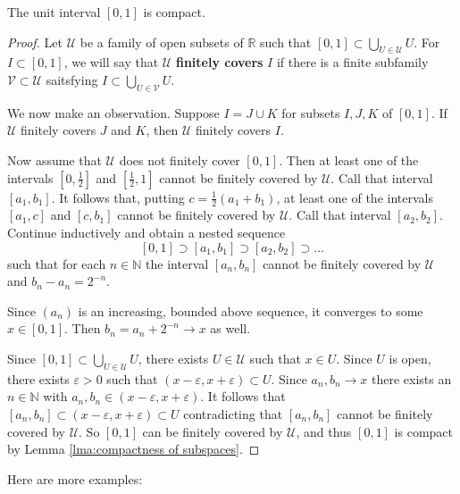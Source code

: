 \documentclass[a4paper]{article}
\begin{document}
\begin{theorem}\label{lma:[0,1] is compact}
    The unit interval $[0,1]$ is compact.
\end{theorem}
\begin{proof}
    Let $\mathcal{U}$ be a family of open subsets of $\mathbb{R}$ such that $[0,1] \subset \bigcup_{U \in \mathcal{U}} U$.
    For $I \subset[0,1]$, we will say that $\mathcal{U}$ \textbf{finitely covers} $I$ if there is a finite subfamily
    $\mathcal{V} \subset \mathcal{U}$ saitsfying $I \subset \bigcup_{U \in \mathcal{V}} U$.

    We now make an observation. Suppose $I=J \cup K$ for subsets $I, J, K$ of $[0,1]$.
    If $\mathcal{U}$ finitely covers $J$ and $K$, then $\mathcal{U}$ finitely covers $I$.

    Now assume that $\mathcal{U}$ does not finitely cover $[0,1]$. Then at least one of the intervals $\left[0, \frac{1}{2}\right]$ and $\left[\frac{1}{2}, 1\right]$ cannot be finitely covered by $\mathcal{U}$. Call that interval  $[a_{1}, b_{1}]$. It follows that, putting $c=\frac{1}{2}\left(a_{1}+b_{1}\right)$, at least one of the intervals $\left[a_{1}, c\right]$ and $\left[c, b_{1}\right]$ cannot be finitely covered by $\mathcal{U}$. Call that interval $\left[a_{2}, b_{2}\right]$. Continue inductively and obtain a nested sequence
    $$
    [0,1] \supset\left[a_{1}, b_{1}\right] \supset\left[a_{2}, b_{2}\right] \supset \ldots
    $$
    such that for each $n \in \mathbb{N}$ the interval $\left[a_{n}, b_{n}\right]$ cannot be finitely covered by $\mathcal{U}$ and $b_{n}-a_{n}=2^{-n}$.

    Since $\left(a_{n}\right)$ is an increasing, bounded above sequence, it converges to some $x \in[0,1]$. Then $b_{n}=a_{n}+2^{-n} \rightarrow x$ as well.

    Since $[0,1] \subset \bigcup_{U \in \mathcal{U}} U$, there exists $U \in \mathcal{U}$ such that $x \in U$. Since $U$ is open, there exists $\varepsilon>0$ such that $(x-\varepsilon, x+\varepsilon) \subset U$. Since $a_{n}, b_{n} \rightarrow x$ there exists an $n \in \mathbb{N}$ with $a_{n}, b_{n} \in(x-\varepsilon, x+\varepsilon)$. It follows that $\left[a_{n}, b_{n}\right] \subset(x-\varepsilon, x+\varepsilon) \subset U$ contradicting that $\left[a_{n}, b_{n}\right]$ cannot be finitely covered by $\mathcal{U}$. So $[0,1]$ can be finitely covered by $\mathcal{U}$, and thus $[0,1]$ is compact by Lemma \ref{lma:compactness of subspaces}.
\end{proof}
Here are more examples:
\end{document}
